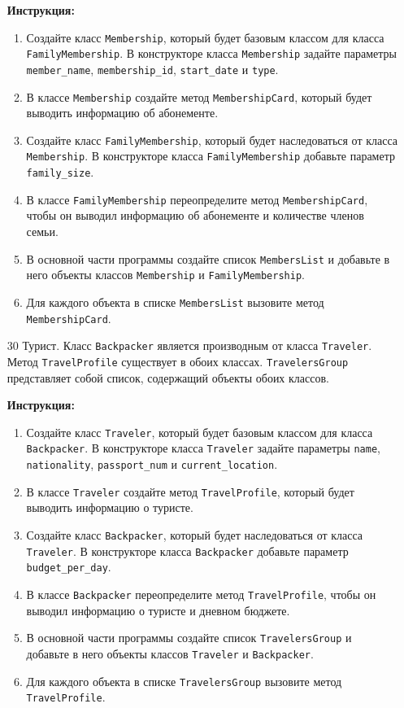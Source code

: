 \begin{enumerate}
\textbf{Инструкция:}
\begin{enumerate}
    \item Создайте класс \texttt{Membership}, который будет базовым классом для класса \texttt{FamilyMembership}. В конструкторе класса \texttt{Membership} задайте параметры \texttt{member\_name}, \texttt{membership\_id}, \texttt{start\_date} и \texttt{type}.
    \item В классе \texttt{Membership} создайте метод \texttt{MembershipCard}, который будет выводить информацию об абонементе.
    \item Создайте класс \texttt{FamilyMembership}, который будет наследоваться от класса \texttt{Membership}. В конструкторе класса \texttt{FamilyMembership} добавьте параметр \texttt{family\_size}.
    \item В классе \texttt{FamilyMembership} переопределите метод \texttt{MembershipCard}, чтобы он выводил информацию об абонементе и количестве членов семьи.
    \item В основной части программы создайте список \texttt{MembersList} и добавьте в него объекты классов \texttt{Membership} и \texttt{FamilyMembership}.
    \item Для каждого объекта в списке \texttt{MembersList} вызовите метод \texttt{MembershipCard}.
\end{enumerate}

\item[30]
Турист. Класс \texttt{Backpacker} является производным от класса \texttt{Traveler}. Метод \texttt{TravelProfile} существует в обоих классах. \texttt{TravelersGroup} представляет собой список, содержащий объекты обоих классов.

\textbf{Инструкция:}
\begin{enumerate}
    \item Создайте класс \texttt{Traveler}, который будет базовым классом для класса \texttt{Backpacker}. В конструкторе класса \texttt{Traveler} задайте параметры \texttt{name}, \texttt{nationality}, \texttt{passport\_num} и \texttt{current\_location}.
    \item В классе \texttt{Traveler} создайте метод \texttt{TravelProfile}, который будет выводить информацию о туристе.
    \item Создайте класс \texttt{Backpacker}, который будет наследоваться от класса \texttt{Traveler}. В конструкторе класса \texttt{Backpacker} добавьте параметр \texttt{budget\_per\_day}.
    \item В классе \texttt{Backpacker} переопределите метод \texttt{TravelProfile}, чтобы он выводил информацию о туристе и дневном бюджете.
    \item В основной части программы создайте список \texttt{TravelersGroup} и добавьте в него объекты классов \texttt{Traveler} и \texttt{Backpacker}.
    \item Для каждого объекта в списке \texttt{TravelersGroup} вызовите метод \texttt{TravelProfile}.
\end{enumerate}


\end{enumerate}
